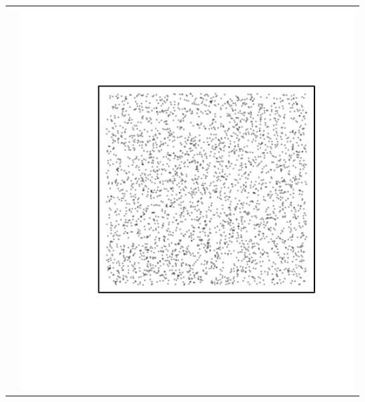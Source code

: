 \documentclass{article}\usepackage{graphicx, color}
\makeatletter
\def\maxwidth{ %
  \ifdim\Gin@nat@width>\linewidth
    \linewidth
  \else
    \Gin@nat@width
  \fi
}
\newenvironment{knitrout}{}{} %
\makeatother
\begin{document}
\begin{tabular}{cc}
&
\begin{knitrout}
\definecolor{shadecolor}{rgb}{0.969, 0.969, 0.969}\color{fgcolor}\includegraphics[width=\maxwidth]{figure/unnamed-chunk-4} 
\end{knitrout}

\\
\end{tabular}
\end{document}
